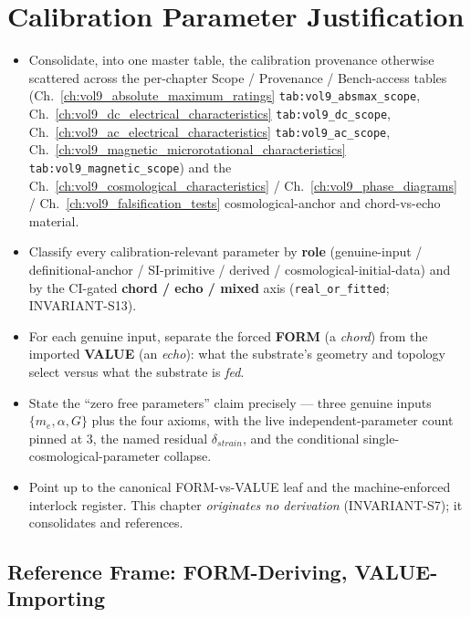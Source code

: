 \chapter{Calibration Parameter Justification}
\label{ch:vol9_calibration_justification}

\begin{objectivebox}
\begin{itemize}
    \item Consolidate, into one master table, the calibration provenance otherwise scattered across the per-chapter Scope / Provenance / Bench-access tables (Ch.~\ref{ch:vol9_absolute_maximum_ratings} \texttt{tab:vol9\_absmax\_scope}, Ch.~\ref{ch:vol9_dc_electrical_characteristics} \texttt{tab:vol9\_dc\_scope}, Ch.~\ref{ch:vol9_ac_electrical_characteristics} \texttt{tab:vol9\_ac\_scope}, Ch.~\ref{ch:vol9_magnetic_microrotational_characteristics} \texttt{tab:vol9\_magnetic\_scope}) and the Ch.~\ref{ch:vol9_cosmological_characteristics} / Ch.~\ref{ch:vol9_phase_diagrams} / Ch.~\ref{ch:vol9_falsification_tests} cosmological-anchor and chord-vs-echo material.
    \item Classify every calibration-relevant parameter by \textbf{role} (genuine-input / definitional-anchor / SI-primitive / derived / cosmological-initial-data) and by the CI-gated \textbf{chord / echo / mixed} axis (\texttt{real\_or\_fitted}; INVARIANT-S13).
    \item For each genuine input, separate the forced \textbf{FORM} (a \emph{chord}) from the imported \textbf{VALUE} (an \emph{echo}): what the substrate's geometry and topology select versus what the substrate is \emph{fed}.
    \item State the ``zero free parameters'' claim precisely --- three genuine inputs $\{m_e, \alpha, G\}$ plus the four axioms, with the live independent-parameter count pinned at $3$, the named residual $\delta_{strain}$, and the conditional single-cosmological-parameter collapse.
    \item Point up to the canonical FORM-vs-VALUE leaf and the machine-enforced interlock register. This chapter \emph{originates no derivation} (INVARIANT-S7); it consolidates and references.
\end{itemize}
\end{objectivebox}

\section{Reference Frame: FORM-Deriving, VALUE-Importing}
\label{sec:vol9_calib_frame}

